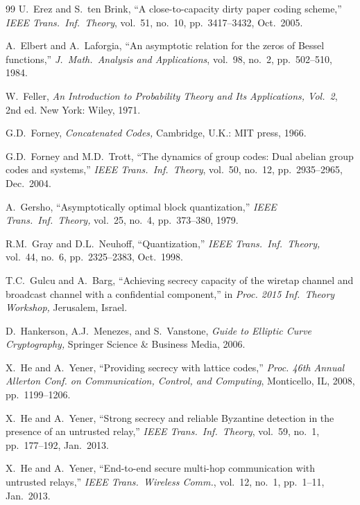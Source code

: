 \documentclass[main.tex]{subfiles}
\begin{document}
\begin{thebibliography}{99}
U.~Erez and S.\ ten Brink, ``A close-to-capacity dirty paper coding scheme,''
\emph{IEEE Trans.\ Inf.\ Theory},  vol.\ 51, no.\ 10, pp.\ 3417--3432, Oct.\ 2005.


  A.\ Elbert and A.\ Laforgia, ``An asymptotic
   relation for the zeros of Bessel functions,''  \emph{J.\ 
     Math.\ Analysis and Applications}, vol.\ 98, no.\ 2, pp.\ 502--510, 1984.

 W.\ Feller, \emph{An Introduction to Probability Theory
and Its Applications, Vol.\ 2}, 2nd ed. New York: Wiley, 1971.

G.D.~Forney, \emph{Concatenated Codes,} Cambridge, U.K.: MIT press, 1966.

G.D.~Forney and M.D.~Trott, ``The dynamics of group codes: Dual abelian group codes and systems,''
\emph{IEEE Trans.\ Inf.\ Theory}, vol.\ 50, no.\ 12, pp.\ 2935--2965, Dec.\ 2004.

A.\ Gersho, ``Asymptotically optimal block quantization,'' \emph{IEEE
Trans.\ Inf.\ Theory,} vol.\ 25, no.\ 4, pp.\ 373--380,
1979.

R.M.\ Gray and D.L.\ Neuhoff, ``Quantization,'' \emph{IEEE
Trans.\ Inf.\ Theory,} vol.\ 44, no.\ 6, pp.\ 2325--2383,
Oct.\ 1998.

 T.C.\ Gulcu and A.\ Barg, ``Achieving
secrecy capacity of the wiretap channel
and broadcast channel with a confidential
component,'' in \emph{Proc. 2015 Inf.\ Theory Workshop,} Jerusalem, Israel.

D.~Hankerson, A.J.~Menezes, and S.~Vanstone, \emph{Guide to Elliptic Curve Cryptography,} Springer Science \& Business Media, 2006.

X.~He and A.~Yener, ``Providing secrecy with lattice codes,'' \emph{Proc. 46th Annual Allerton Conf. on Communication, Control, and Computing}, 
Monticello, IL, 2008, pp.\ 1199--1206.

X.~He and A.~Yener, ``Strong secrecy and reliable Byzantine detection in the presence of an untrusted relay,'' 
\emph{IEEE Trans.\ Inf.\ Theory}, vol.\ 59, no.\ 1, pp.\ 177--192, Jan.\ 2013.

X.~He and A.~Yener, ``End-to-end secure multi-hop communication with untrusted relays,''
\emph{IEEE Trans.\ Wireless Comm.}, vol.\ 12, no.\ 1, pp.\ 1--11, Jan.\ 2013.


\end{thebibliography}
\end{document}

